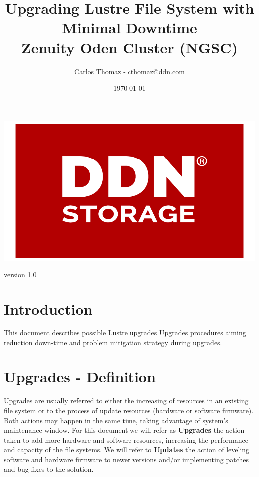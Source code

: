 \documentclass{article}
\title{%
Upgrading Lustre File System with Minimal Downtime\\
\large Zenuity Oden Cluster (NGSC)}
\author{Carlos Thomaz - cthomaz@ddn.com}
\date{\today}
\begin{document}
\maketitle


\begin{center}
    \includegraphics[scale=0.14]{logo.png}\\[1cm] 
\end{center}
\begin{center}
    version 1.0
\end{center}
\newpage

\begin{versionhistory}
\end{versionhistory}

\newpage

\tableofcontents

\newpage
\section{Introduction}
This document describes possible Lustre upgrades Upgrades procedures aiming reduction down-time and problem  mitigation strategy during upgrades. 

\section{Upgrades - Definition}
Upgrades are usually referred to either the increasing of resources in an existing file system or to the process of update resources (hardware or software firmware). Both actions may happen in the same time, taking advantage of system's maintenance window. For this document we will refer as \textbf{Upgrades} the action taken to add more hardware and software resources, increasing the performance and capacity of the file systems. We will refer to \textbf{Updates} the action of leveling software and hardware firmware to newer versions and/or implementing patches and bug fixes to the solution.
\end{document}
